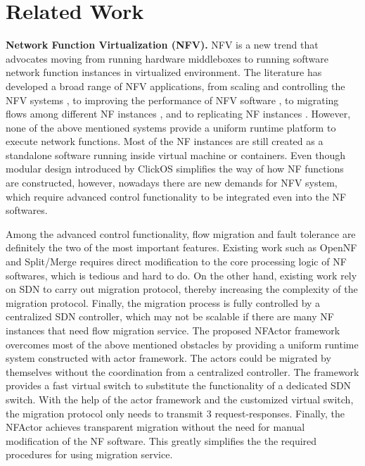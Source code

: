 \section{Related Work}
\label{sec:relatedwork}




\textbf{Network Function Virtualization (NFV).} NFV is a new trend that advocates moving from running hardware middleboxes to running software network function instances in virtualized environment. The literature has developed a broad range of NFV applications, from scaling and controlling the NFV systems \cite{gember2012stratos, palkar2015e2}, to improving the performance of NFV software \cite{hwang2015netvm, Han:EECS-2015-155, martins2014clickos, 199352}, to migrating flows among different NF instances \cite{rajagopalan2013split, khalid2016paving, gember2015opennf}, and to replicating NF instances \cite{rajagopalan2013pico, sherry2015rollback}. However, none of the above mentioned systems provide a uniform runtime platform to execute network functions. Most of the NF instances are still created as a standalone software running inside virtual machine or containers. Even though modular design introduced by ClickOS \cite{kohler2000click} simplifies the way of how NF functions are constructed, however, nowadays there are new demands for NFV system, which require advanced control functionality to be integrated even into the NF softwares. 

Among the advanced control functionality, flow migration and fault tolerance are definitely the two of the most important features. Existing work such as OpenNF \cite{gember2015opennf} and Split/Merge \cite{rajagopalan2013split} requires direct modification to the core processing logic of NF softwares, which is tedious and hard to do. On the other hand, existing work rely on SDN to carry out migration protocol, thereby increasing the complexity of the migration protocol. Finally, the migration process is fully controlled by a  centralized SDN controller, which may not be scalable if there are many NF instances that need flow migration service. The proposed NFActor framework overcomes most of the above mentioned obstacles by providing a uniform runtime system constructed with actor framework. The actors could be migrated by themselves without the coordination from a centralized controller. The framework provides a  fast virtual switch to substitute the functionality of a dedicated SDN switch. With the help of the actor framework and the customized virtual switch, the migration protocol only needs to transmit 3 request-responses. Finally, the NFActor achieves transparent migration without the need for manual modification of the NF software. This greatly simplifies the the required procedures for using migration service.

